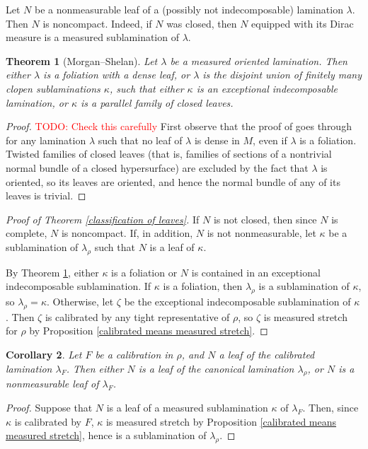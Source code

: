 \documentclass[reqno,11pt]{amsart}
\newtheorem{theorem}{Theorem}[section]
\newtheorem{corollary}[theorem]{Corollary}
\theoremstyle{definition}
\numberwithin{equation}{section}
\newcommand\todo[1]{\textcolor{red}{TODO: #1}}
\begin{document}
Let $N$ be a nonmeasurable leaf of a (possibly not indecomposable) lamination $\lambda$.
Then $N$ is noncompact.
Indeed, if $N$ was closed, then $N$ equipped with its Dirac measure is a measured sublamination of $\lambda$.

\begin{theorem}[Morgan--Shelan]\label{MorganShelan}
Let $\lambda$ be a measured oriented lamination.
Then either $\lambda$ is a foliation with a dense leaf, or $\lambda$ is the disjoint union of finitely many clopen sublaminations $\kappa$, such that either $\kappa$ is an exceptional indecomposable lamination, or $\kappa$ is a parallel family of closed leaves.
\end{theorem}
\begin{proof}
  \todo{Check this carefully}
First observe that the proof of \cite[Theorem I.3.2]{Morgan88} goes through for any lamination $\lambda$ such that no leaf of $\lambda$ is dense in $M$, even if $\lambda$ is a foliation.
Twisted families of closed leaves (that is, families of sections of a nontrivial normal bundle of a closed hypersurface) are excluded by the fact that $\lambda$ is oriented, so its leaves are oriented, and hence the normal bundle of any of its leaves is trivial.
\end{proof}

\begin{proof}[Proof of Theorem \ref{classification of leaves}]
If $N$ is not closed, then since $N$ is complete, $N$ is noncompact.
If, in addition, $N$ is not nonmeasurable, let $\kappa$ be a sublamination of $\lambda_\rho$ such that $N$ is a leaf of $\kappa$.

By Theorem \ref{MorganShelan}, either $\kappa$ is a foliation or $N$ is contained in an exceptional indecomposable sublamination.
If $\kappa$ is a foliation, then $\lambda_\rho$ is a sublamination of $\kappa$, so $\lambda_\rho = \kappa$.
Otherwise, let $\zeta$ be the exceptional indecomposable sublamination of $\kappa$.
Then $\zeta$ is calibrated by any tight representative of $\rho$, so $\zeta$ is measured stretch for $\rho$ by Proposition \ref{calibrated means measured stretch}.
\end{proof}

\begin{corollary}
Let $F$ be a calibration in $\rho$, and $N$ a leaf of the calibrated lamination $\lambda_F$.
Then either $N$ is a leaf of the canonical lamination $\lambda_\rho$, or $N$ is a nonmeasurable leaf of $\lambda_F$.
\end{corollary}
\begin{proof}
Suppose that $N$ is a leaf of a measured sublamination $\kappa$ of $\lambda_F$.
Then, since $\kappa$ is calibrated by $F$, $\kappa$ is measured stretch by Proposition \ref{calibrated means measured stretch}, hence is a sublamination of $\lambda_\rho$.
\end{proof}
\end{document}
